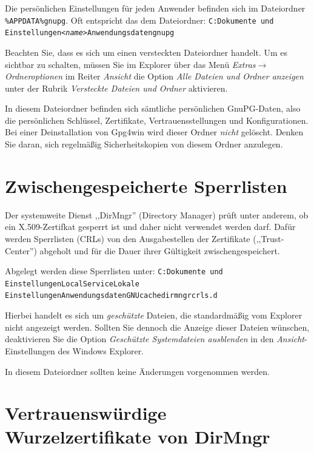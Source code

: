 \documentclass[a4paper,11pt, oneside,openright,titlepage,dvips]{scrbook}
\newcommand{\Menu}[1]{\emph{#1}}
\newcommand{\Filename}[1]{\texttt{#1}}
\newcommand\margin[1]{\marginline {\sffamily\scriptsize #1}}
\newcommand{\IncludeImage}[2][]{\texorhtml{%
\texttt{[image: \#2]}%
}{%
\htmlimg{#2.png}%
}}
\newcounter{chapter}
\newcounter{section}[chapter]
\begin{document}
Die persönlichen Einstellungen für jeden Anwender befinden sich
im Dateiordner \Filename{\%APPDATA\%\back{}gnupg}. Oft entspricht das dem
Dateiordner: \newline
\Filename{C:\back{}Dokumente und Einstellungen\back{}\textit{<name>}\back{}Anwendungsdaten\back{}gnupg\back{}}

Beachten Sie, dass es sich um einen versteckten Dateiordner handelt.
Um es sichtbar zu schalten, müssen Sie im Explorer über das Menü
\Menu{Extras$\rightarrow$Ordneroptionen}
im Reiter \Menu{Ansicht} die Option \Menu{Alle Dateien und Ordner
anzeigen} unter der Rubrik \Menu{Versteckte Dateien und Ordner} aktivieren.

In diesem Dateiordner befinden sich sämtliche persönlichen
GnuPG-Daten,
also die persönlichen Schlüssel, Zertifikate, Vertrauensstellungen und
Konfigurationen. Bei einer Deinstallation von Gpg4win wird dieser
Ordner \textit{nicht} gelöscht. Denken Sie daran, sich regelmäßig
Sicherheitskopien von diesem Ordner anzulegen.


\section{Zwischengespeicherte Sperrlisten}
\T\margin{\IncludeImage[width=1.5cm]{smime-icon}}

Der systemweite Dienst ,,DirMngr'' (Directory Manager) prüft unter anderem, ob
ein X.509-Zertifkat gesperrt ist und daher nicht verwendet werden darf.
Dafür werden Sperrlisten (CRLs) von den Ausgabestellen der Zertifikate
(,,Trust-Center'') abgeholt und für die Dauer ihrer Gültigkeit
zwischengespeichert.

Abgelegt werden diese Sperrlisten unter:\newline
\Filename{C:\back{}Dokumente und Einstellungen\back{}LocalService\back{}Lokale\T\newline
Einstellungen\back{}Anwendungsdaten\back{}GNU\back{}cache\back{}dirmngr\back{}crls.d\back{}}

Hierbei handelt es sich um \textit{geschützte} Dateien,
die standardmäßig vom Explorer nicht angezeigt werden. Sollten Sie
dennoch die Anzeige dieser Dateien wünschen, deaktivieren Sie die
Option \Menu{Geschützte Systemdateien ausblenden} in den
\textit{Ansicht}-Einstellungen des Windows Explorer.

In diesem Dateiordner sollten keine Änderungen vorgenommen werden.

\section{Vertrauenswürdige Wurzelzertifikate von DirMngr}
\label{trustedrootcertsdirmngr}
\T\margin{\IncludeImage[width=1.5cm]{smime-icon}}
\end{document}
